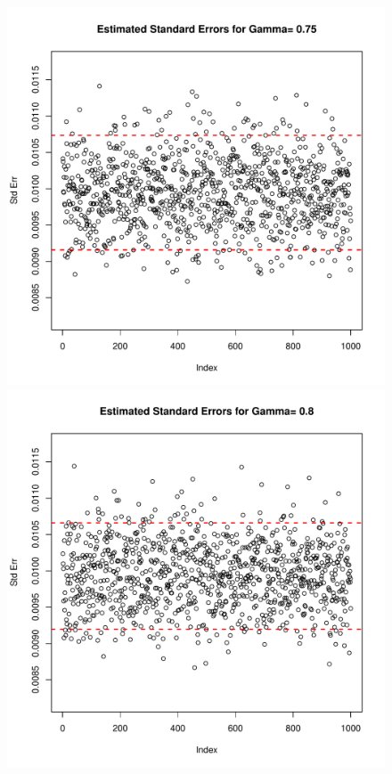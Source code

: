 \documentclass[a4paper, 11pt]{report}
\begin{document}
\begin{enumerate}
\begin{figure}[H]
				\includegraphics[scale=0.50]{index_plot_se_s5_r50_g75.pdf}			
				\includegraphics[scale=0.50]{index_plot_se_s5_r50_g80.pdf} \\				

\end{figure}
\end{enumerate}
\end{document}
